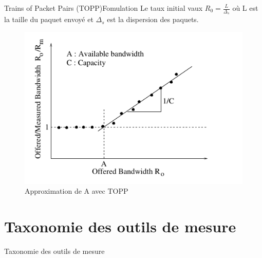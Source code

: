 \documentclass[compress]{beamer}
\begin{document}
\begin{frame}{Trains of Packet Pairs (TOPP)}{Fomulation}
Le taux initial vaux
$R_0 = \frac{L}{\Delta_s}$ où L est la taille du paquet envoyé et $\Delta_s$ est la dispersion des paquets.
\begin{figure}[hbtp]
		\centering
		\includegraphics[scale=0.4]{TOPP.png}
		\caption{Approximation de A avec TOPP}
	\end{figure}
\end{frame}

\section{Taxonomie des outils de mesure}
\begin{frame}{Taxonomie des outils de mesure}

\end{frame}
\end{document}
